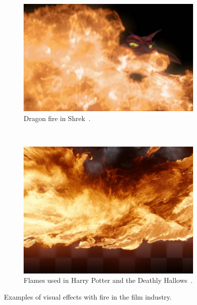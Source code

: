 \begin{figure}[htpb!]
\begin{subfigure}[t]{0.5\textwidth}
                \includegraphics[width=\textwidth]{img/lamorlette_2002}
                \caption{Dragon fire in Shrek~\cite{Lamorlette:2002}.}
                \label{fig:lamorlette_2002}
        \end{subfigure}
        ~ %
        \begin{subfigure}[b]{0.5\textwidth}
                \includegraphics[width=\textwidth]{img/horvath_2009}
                \caption{Flames used in Harry Potter and the Deathly Hallows~\cite{Horvath:2009}.}
                \label{fig:horvath_2009}
        \end{subfigure}
        \caption{Examples of visual effects with fire in the film industry.}
\end{figure}


